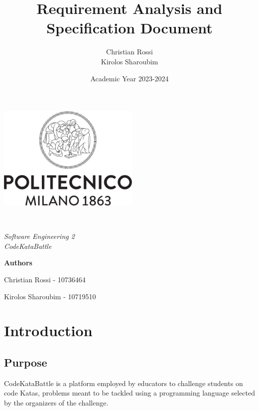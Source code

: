 \documentclass[12pt, a4paper]{report}
\title{Requirement Analysis and Specification Document}
\author{Christian Rossi \\ Kirolos Sharoubim}
\date{Academic Year 2023-2024}
\begin{document}
\begin{titlingpage} 
    \begin{center}
        \includegraphics[height=5cm]{images/polimi.png}\\
        \vspace{4cm}
        \begin{huge} 
            \textbf{\thetitle} \\
        \end{huge}
        \vspace{0.3cm}
        \begin{Large}
            \textit{Software Engineering 2 \\CodeKataBattle} \\
        \end{Large}
    \end{center}
    \vspace{9cm}
        \begin{center}      
            \textbf{Authors}    

            Christian Rossi - 10736464   

            Kirolos Sharoubim - 10719510
    \end{center}
\end{titlingpage}

\newpage

\tableofcontents

\newpage

\chapter{Introduction}
    \section{Purpose}
    CodeKataBattle is a platform employed by educators to challenge students on code Katas, problems meant to be tackled using a programming language selected by 
    the organizers of the challenge.
    
\end{document}

